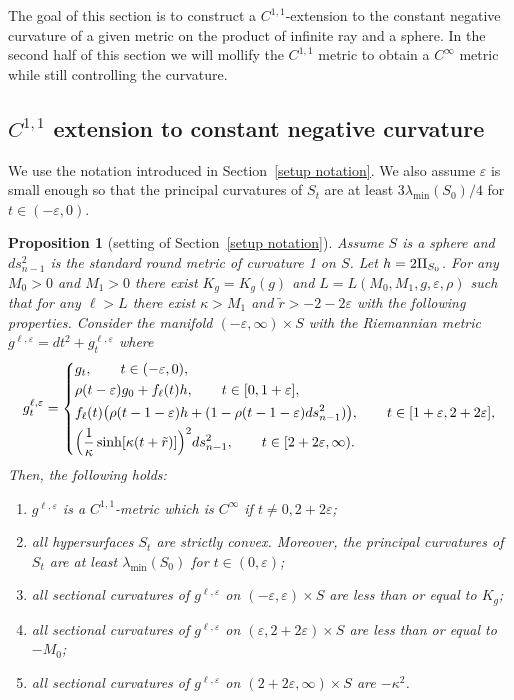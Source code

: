 \documentclass[JEP,XML,SOM,Unicode,NoFloatCountersInSection]{cedram}
\newenvironment{enumeratea}
{\bgroup\def\theenumi{\alph{enumi}}\begin{enumerate}}
{\end{enumerate}\egroup}
\newtheorem{proposition}[theorem]{Proposition}
\theoremstyle{definition}
\let\eps\varepsilon
\newcommand{\RomanNumeralCaps}[1]
{\MakeUppercase{\romannumeral #1}}
\newcommand{\II}{\textup{\RomanNumeralCaps{2}}}
\renewcommand{\>}{{\rangle}}
\newcommand{\<}{{\langle}}
\begin{document}
The goal of this section is to construct a $C^{1,1}$-extension to the constant negative curvature of a given metric on the product of infinite ray and a sphere. In the second half of this section we will mollify the $C^{1,1}$ metric to obtain a $C^\infty$ metric while still controlling the curvature.

\subsection{\texorpdfstring{$C^{1,1}$}{C} extension to constant negative curvature}\label{C1 extension}
We use the notation introduced in Section~\ref{setup notation}. We also assume $\eps$ is small enough so that the principal curvatures of $S_t$ are at least $3\lambda_{\min}(S_0)/4$ for $t\in(-\eps, 0)$.

\begin{proposition}[setting of Section~\ref{setup notation}]\label{prop: C11 extension}
Assume $S$ is a sphere and $ds_{n-1}^2$ is the standard round metric of curvature 1 on $S$. Let $h=2\II_{S_0}$. For any $M_0>0$ and $M_1>0$ there exist $K_g=K_g(g)$ and $L=L(M_0, M_1,g,\eps,\rho)$ such that for any $\ell>L$ there exist $\kappa>M_1$ and $\tilde r>-2-2\eps$ with the following properties. Consider the manifold $(-\eps,\infty)\times S$ with the Riemannian metric $g^{\ell,\eps}=dt^2+g^{\ell,\eps}_t$ where
\begin{equation*}
g^{\ell,\eps}_t = \left\{\begin{aligned} &g_t, \qquad t\in(-\eps,0),\\
&\rho(t-\eps)g_0+f_{\ell}(t)h, \qquad t\in[0,1+\eps],\\
&f_{\ell}(t)\bigl(\rho(t-1-\eps)h+(1-\rho(t-1-\eps)ds^2_{n-1})\bigr), \qquad t\in[1+\eps,2+2\eps],\\
&\Bigl(\frac{1}{\kappa}\sinh[\kappa(t+\tilde r)] \Bigr)^2ds^2_{n-1}, \qquad t\in[2+2\eps,\infty).
\end{aligned}\right.
\end{equation*}
Then, the following holds:
\begin{enumeratea}
\item\label{prop: C11 extensiona} $g^{\ell,\eps}$ is a $C^{1,1}$-metric which is $C^\infty$ if $t\neq 0, 2+2\eps$;
\item\label{prop: C11 extensionb} all hypersurfaces $S_t$ are strictly convex. Moreover, the principal curvatures of~$S_t$ are at least $\lambda_{\min}(S_0)$ for $t\in(0,\eps)$;
\item\label{prop: C11 extensionc} all sectional curvatures of $g^{\ell,\eps}$ on $(-\eps,\eps)\times S$ are less than or equal to $K_g$;
\item\label{prop: C11 extensiond} all sectional curvatures of $g^{\ell,\eps}$ on $(\eps,2+2\eps)\times S$ are less than or equal to $-M_0$;
\item\label{prop: C11 extensione} all sectional curvatures of $g^{\ell,\eps}$ on $(2+2\eps, \infty)\times S$ are $-\kappa^2$.
\end{enumeratea}
\end{proposition}
\end{document}
